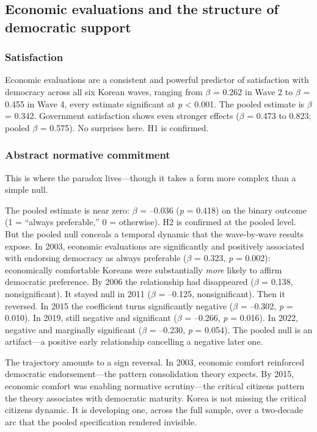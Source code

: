 \documentclass[
  12pt,
  12pt,
  letterpaper]{article}
\begin{document}
\subsection{Economic evaluations and the structure of democratic
support}\label{economic-evaluations-and-the-structure-of-democratic-support}

\subsubsection{Satisfaction}\label{satisfaction}

Economic evaluations are a consistent and powerful predictor of
satisfaction with democracy across all six Korean waves, ranging from
\(\beta\) = 0.262 in Wave 2 to \(\beta\) = 0.455 in Wave 4, every
estimate significant at \emph{p} \textless{} 0.001. The pooled estimate
is \(\beta\) = 0.342. Government satisfaction shows even stronger
effects (\(\beta\) = 0.473 to 0.823; pooled \(\beta\) = 0.575). No
surprises here. H1 is confirmed.

\subsubsection{Abstract normative
commitment}\label{abstract-normative-commitment}

This is where the paradox lives---though it takes a form more complex
than a simple null.

The pooled estimate is near zero: \(\beta\) = --0.036 (\emph{p} = 0.418)
on the binary outcome (1 = ``always preferable,'' 0 = otherwise). H2 is
confirmed at the pooled level. But the pooled null conceals a temporal
dynamic that the wave-by-wave results expose. In 2003, economic
evaluations are significantly and positively associated with endorsing
democracy as always preferable (\(\beta\) = 0.323, \emph{p} = 0.002):
economically comfortable Koreans were substantially \emph{more} likely
to affirm democratic preference. By 2006 the relationship had
disappeared (\(\beta\) = 0.138, nonsignificant). It stayed null in 2011
(\(\beta\) = --0.125, nonsignificant). Then it reversed. In 2015 the
coefficient turns significantly negative (\(\beta\) = --0.302, \emph{p}
= 0.010). In 2019, still negative and significant (\(\beta\) = --0.266,
\emph{p} = 0.016). In 2022, negative and marginally significant
(\(\beta\) = --0.230, \emph{p} = 0.054). The pooled null is an
artifact---a positive early relationship cancelling a negative later
one.

The trajectory amounts to a sign reversal. In 2003, economic comfort
reinforced democratic endorsement---the pattern consolidation theory
expects. By 2015, economic comfort was enabling normative scrutiny---the
critical citizens pattern the theory associates with democratic
maturity. Korea is not missing the critical citizens dynamic. It is
developing one, across the full sample, over a two-decade arc that the
pooled specification rendered invisible.
\end{document}
